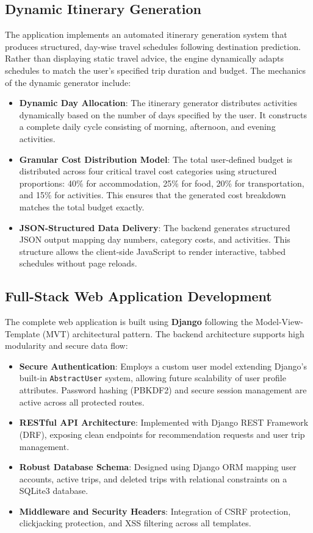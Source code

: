 \subsection{Dynamic Itinerary Generation}

The application implements an automated itinerary generation system that produces structured, day-wise travel schedules following destination prediction. Rather than displaying static travel advice, the engine dynamically adapts schedules to match the user's specified trip duration and budget.
The mechanics of the dynamic generator include:
\begin{itemize}
    \item \textbf{Dynamic Day Allocation}: The itinerary generator distributes activities dynamically based on the number of days specified by the user. It constructs a complete daily cycle consisting of morning, afternoon, and evening activities.
    \item \textbf{Granular Cost Distribution Model}: The total user-defined budget is distributed across four critical travel cost categories using structured proportions: 40\% for accommodation, 25\% for food, 20\% for transportation, and 15\% for activities. This ensures that the generated cost breakdown matches the total budget exactly.
    \item \textbf{JSON-Structured Data Delivery}: The backend generates structured JSON output mapping day numbers, category costs, and activities. This structure allows the client-side JavaScript to render interactive, tabbed schedules without page reloads.
\end{itemize}

\subsection{Full-Stack Web Application Development}

The complete web application is built using \textbf{Django} \cite{django2026} following the Model-View-Template (MVT) architectural pattern. The backend architecture supports high modularity and secure data flow:
\begin{itemize}
    \item \textbf{Secure Authentication}: Employs a custom user model extending Django's built-in \texttt{AbstractUser} system, allowing future scalability of user profile attributes. Password hashing (PBKDF2) and secure session management are active across all protected routes.
    \item \textbf{RESTful API Architecture}: Implemented with Django REST Framework (DRF), exposing clean endpoints for recommendation requests and user trip management.
    \item \textbf{Robust Database Schema}: Designed using Django ORM mapping user accounts, active trips, and deleted trips with relational constraints on a SQLite3 database.
    \item \textbf{Middleware and Security Headers}: Integration of CSRF protection, clickjacking protection, and XSS filtering across all templates.
\end{itemize}


